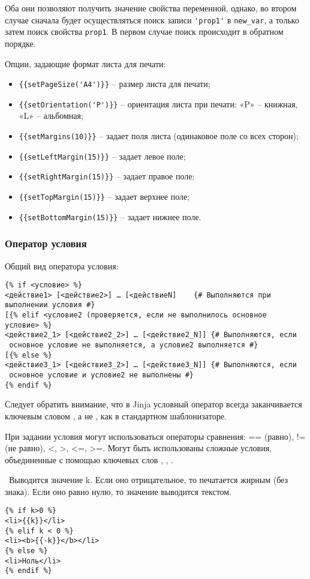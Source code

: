 Оба они позволяют получить значение свойства переменной, однако, во втором случае сначала будет осуществляться поиск записи \verb|'prop1'| в \verb|new_var|, а только затем поиск свойства \verb|prop1|. В первом случае поиск происходит в обратном порядке.

Опции, задающие формат листа для печати:
\begin{itemize}
 \item \verb|{{setPageSize('A4')}}| – размер листа для печати;
 \item \verb|{{setOrientation('P')}}| – ориентация листа при печати: «P» – книжная, «L» – альбомная;
 \item \verb|{{setMargins(10)}}| – задает поля листа (одинаковое поле со всех сторон);
 \item \verb|{{setLeftMargin(15)}}| – задает левое поле;
 \item \verb|{{setRightMargin(15)}}| – задает правое поле;
 \item \verb|{{setTopMargin(15)}}| – задает верхнее поле;
 \item \verb|{{setBottomMargin(15)}}| – задает нижнее поле.
\end{itemize}
 
\subsubsection{Оператор условия}

Общий вид оператора условия:
\begin{verbatim}
{% if <условие> %}
<действие1> [<действие2>] … [<действиеN]	{# Выполняются при 
выполнении условия #}
[{% elif <условие2 (проверяется, если не выполнилось основное 
условие> %}
<действие2_1> [<действие2_2>] … [<действие2_N]]	{# Выполняются, если
 основное условие не выполняется, а условие2 выполняется #}
[{% else %}
<действие3_1> [<действие3_2>] … [<действие3_N]]	{# Выполняются, если
 основное условие и условие2 не выполнены #}
{% endif %}
\end{verbatim}

Следует обратить внимание, что в Jinja условный оператор всегда заканчивается ключевым словом , а не , как в стандартном шаблонизаторе.

При задании условия могут использоваться операторы сравнения: == (равно), != (не равно), <, >, <=, >=. Могут быть использованы сложные условия, объединенные с помощью ключевых слов , , .

 ~Выводится значение k. Если оно отрицательное, то печатается жирным (без знака). Если оно равно нулю, то значение выводится текстом.
\begin{verbatim}
{% if k>0 %}
<li>{{k}}</li>
{% elif k < 0 %}
<li><b>{{-k}}</b></li>
{% else %}
<li>Ноль</li>
{% endif %}
\end{verbatim}


